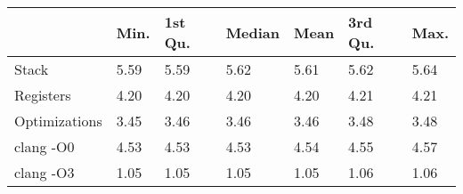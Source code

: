 \begin{table}[ht]
\centering
\begin{tabular}{p{}p{}p{}p{}p{}p{}p{}}
  \hline
 & Min. & 1st Qu. & Median & Mean & 3rd Qu. & Max. \\ 
  \hline
Stack & 5.59 & 5.59 & 5.62 & 5.61 & 5.62 & 5.64 \\ 
  Registers & 4.20 & 4.20 & 4.20 & 4.20 & 4.21 & 4.21 \\ 
  Optimizations & 3.45 & 3.46 & 3.46 & 3.46 & 3.48 & 3.48 \\ 
  clang -O0 & 4.53 & 4.53 & 4.53 & 4.54 & 4.55 & 4.57 \\ 
  clang -O3 & 1.05 & 1.05 & 1.05 & 1.05 & 1.06 & 1.06 \\ 
   \hline
\end{tabular}
\end{table}
